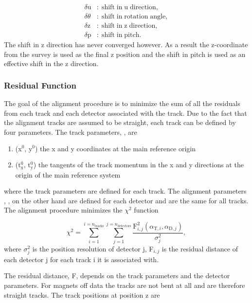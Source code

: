 \begin{align}
  \delta \mathrm{u} & \mathrm{: \; shift \; in \; u \; direction,}  \\
  \delta \theta & \mathrm{: \; shift \; in \; rotation \; angle,}  \\
  \delta \mathrm{z} & \mathrm{: \; shift \; in \; z \; direction,}  \\
  \delta \mathrm{p} & \mathrm{: \; shift \; in \; pitch.} 
\end{align}
\noindent
The shift in z direction has never converged however.  As a result the
z-coordinate from the survey is used as the final z position and the shift in
pitch is used as an effective shift in the z direction.

\subsubsection{Residual Function}

The goal of the alignment procedure is to minimize the sum of all the residuals
from each track and each detector associated with the track.  Due to the fact
that the alignment tracks are assumed to be straight, each track can be defined
by four parameters.  The track parameters, {\atrack}, are

\begin{enumerate}[label=\roman*:]
\item (x$^0$, y$^0$) the x and y coordinates at the main reference origin
\item (t$_{\mathrm{x}}^0$, t$_{\mathrm{y}}^0$) the tangents of the track
  momentum in the x and y directions at the origin of the main reference system
\end{enumerate}
\noindent
where the track parameters are defined for each track.  The alignment parameters
, {\adet}, on the other hand are defined for each detector and are the same for
all tracks.  The alignment procedure minimizes the $\chi^2$ function

\begin{equation}
  \chi^2 =
  \sum_{i=1}^{i=n_{\mathrm{tracks}}}\sum_{j=1}^{j=n_{\mathrm{detectors}}}
  \frac{\mathrm{F}^2_{i,j}(\alpha_{\mathrm{T}, i}, \alpha_{\mathrm{D},
      j})}{\sigma_j^2},
  \label{equ::chi_align}%
\end{equation}
\noindent
where $\sigma^2_j$ is the position resolution of detector j, F$_{i,j}$ is the
residual distance of each detector j for each track i it is associated with.

The residual distance, F, depends on the track parameters and the detector
parameters.  For magnets off data the tracks are not bent at all and are
therefore straight tracks.  The track positions at position z are 

